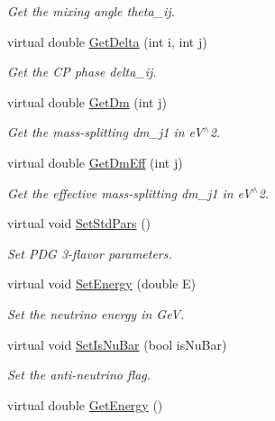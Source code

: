 \begin{DoxyCompactItemize}
\begin{DoxyCompactList}\small\item\em Get the mixing angle theta\+\_\+ij. \end{DoxyCompactList}\item 
virtual double \hyperlink{classOscProb_1_1PMNS__Base_adb8dbc91d4286d2e7c8f768c59476241}{Get\+Delta} (int i, int j)
\begin{DoxyCompactList}\small\item\em Get the CP phase delta\+\_\+ij. \end{DoxyCompactList}\item 
virtual double \hyperlink{classOscProb_1_1PMNS__Base_ad26815ac5f4805d1259817e4936e5f8f}{Get\+Dm} (int j)
\begin{DoxyCompactList}\small\item\em Get the mass-\/splitting dm\+\_\+j1 in e\+V$^\wedge$2. \end{DoxyCompactList}\item 
virtual double \hyperlink{classOscProb_1_1PMNS__Base_a4ea861a6707ce1be3a54aad2b60f8632}{Get\+Dm\+Eff} (int j)
\begin{DoxyCompactList}\small\item\em Get the effective mass-\/splitting dm\+\_\+j1 in e\+V$^\wedge$2. \end{DoxyCompactList}\item 
virtual void \hyperlink{classOscProb_1_1PMNS__Base_a4de96ac9b6d1e9b029ab877e57d211ad}{Set\+Std\+Pars} ()
\begin{DoxyCompactList}\small\item\em Set P\+DG 3-\/flavor parameters. \end{DoxyCompactList}\item 
virtual void \hyperlink{classOscProb_1_1PMNS__Base_a95b3b0d0cab5e6a54b5ef99587f837c0}{Set\+Energy} (double E)
\begin{DoxyCompactList}\small\item\em Set the neutrino energy in GeV. \end{DoxyCompactList}\item 
virtual void \hyperlink{classOscProb_1_1PMNS__Base_a717e0348cf762f3961854e332a9b52e0}{Set\+Is\+Nu\+Bar} (bool is\+Nu\+Bar)
\begin{DoxyCompactList}\small\item\em Set the anti-\/neutrino flag. \end{DoxyCompactList}\item 
virtual double \hyperlink{classOscProb_1_1PMNS__Base_acc0d46cc4b8f911b40b807225003bbed}{Get\+Energy} ()

\end{DoxyCompactItemize}
